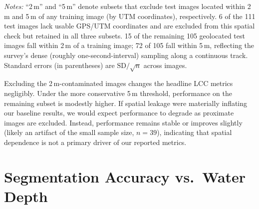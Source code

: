 \documentclass[11pt]{elsarticle}
\begin{document}
\begin{table}[htbp]
\centering
\caption{Live coral cover IoU, Dice, and pixel accuracy on the test set, with vs.\ without spatially-contaminated test images excluded.}
\label{tab:spatial-robustness}
\begin{tablenotes}
\item \emph{Notes:} ``2\,m'' and ``5\,m'' denote subsets that exclude test images located within 2\,m and 5\,m of any training image (by UTM coordinates), respectively. 6 of the 111 test images lack usable GPS/UTM coordinates and are excluded from this spatial check but retained in all three subsets. 15 of the remaining 105 geolocated test images fall within 2\,m of a training image; 72 of 105 fall within 5\,m, reflecting the survey's dense (roughly one-second-interval) sampling along a continuous track. Standard errors (in parentheses) are $\mathrm{SD}/\!\sqrt{n}$ across images.
\end{tablenotes}
\end{table}

Excluding the 2\,m-contaminated images changes the headline LCC metrics negligibly. Under the more conservative 5\,m threshold, performance on the remaining subset is modestly higher. If spatial leakage were materially inflating our baseline results, we would expect performance to degrade as proximate images are excluded. Instead, performance remains stable or improves slightly (likely an artifact of the small sample size, $n=39$), indicating that spatial dependence is not a primary driver of our reported metrics.

\section{Segmentation Accuracy vs.\ Water Depth}
\label{app:depth}
\end{document}
